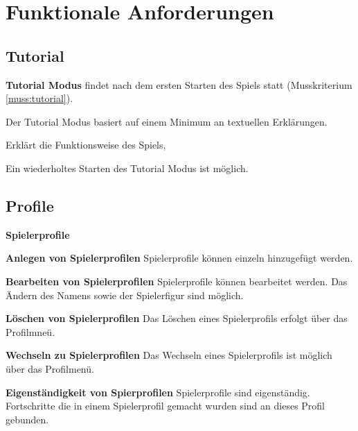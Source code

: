 \documentclass{scrartcl}
\begin{document}

\section{Funktionale Anforderungen}


\subsection{Tutorial} %
\label{sub:fa:tutorial}


\begin{falist}
	\item \label{fa:tutorial} \textbf{Tutorial Modus} findet nach dem ersten Starten des Spiels statt (Musskriterium \ref{muss:tutorial}).
	\begin{falist} 
        \item \label{fa:tutorial_01}Der Tutorial Modus basiert auf einem Minimum an textuellen Erklärungen.
        \item \label{fa:tutorial_02}Erklärt die Funktionsweise des Spiels,
		\item \label{fa:tutorial_03}Ein wiederholtes Starten des Tutorial Modus ist möglich.
	\end{falist}
\end{falist}

\subsection{Profile}
\begin{falist}[resume]
	\item \label{fa:spielerprofile} \textbf{Spielerprofile}
	\begin{falist}
		\item \label{fa:spielerprofile_anlegen} \textbf{Anlegen von Spielerprofilen} Spielerprofile können einzeln hinzugefügt werden.
		\item \label{fa:spielerprofile_bearbeiten} \textbf{Bearbeiten von Spielerprofilen} Spielerprofile können bearbeitet werden. Das Ändern des Namens sowie der Spielerfigur sind möglich.
		\item \label{fa:spielerprofile_loeschen} \textbf{Löschen von Spielerprofilen} Das Löschen eines Spielerprofils erfolgt über das Profilmneü.
		\item \label{fa:spielerprofile_wechseln} \textbf{Wechseln zu Spielerprofilen} Das Wechseln eines Spielerprofils ist möglich über das Profilmenü.
		\item \label{fa:spielerprofile_separiert} \textbf{Eigenständigkeit von Spierprofilen} Spielerprofile sind eigenständig. Fortschritte die in einem Spielerprofil gemacht wurden sind an dieses Profil gebunden.
	\end{falist}
\end{falist}
\end{document}
